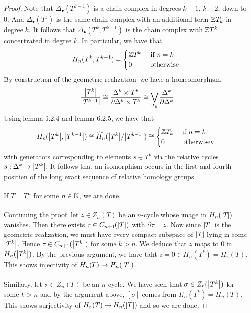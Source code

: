 \documentclass[a4paper]{article}
\begin{document}
\begin{thm}{}{}
\begin{proof}
Note that $\Delta_\bullet(T^{k-1})$ is a chain complex in degrees $k-1$, $k-2$, down to $0$. And $\Delta_\bullet(T^k)$ is the same chain complex with an additional term $\mathbb{Z} T_k$ in degree $k$. It follows that $\Delta_\bullet(T^k,T^{k-1})$ is the chain complex with $\mathbb{Z} T^k$ concentrated in degree $k$. In particular, we have that $$H_n(T^k,T^{k-1})=\begin{cases}
\mathbb{Z} T^k & \text{ if } n=k\\
0 & \text{ otherwise }
\end{cases}$$
By construction of the geometric realization, we have a homeomorphism $$\frac{\abs{T^k}}{\abs{T^{k-1}}}\cong\frac{\Delta^k\times T^k}{\partial\Delta^k\times T^k}\cong\bigvee_{T_k}\frac{\Delta^k}{\partial\Delta^k}$$ Using lemma 6.2.4 and lemma 6.2.5, we have that $$H_n(\abs{T^k},\abs{T^{k-1}})\cong\widetilde{H_n}(\abs{T^k}/\abs{T^{k-1}})\cong\begin{cases}
\mathbb{Z} T_k & \text{ if } n=k\\
0 & \text{ otherwisev }
\end{cases}$$
with generators corresponding to elements $s\in T^k$ via the relative cycles $s:\Delta^k\to\abs{T^k}$. It follows that an isomorphism occurs in the first and fourth position of the long exact sequence of relative homology groups. \\~\\

If $T=T^n$ for some $n\in\mathbb{N}$, we are done. \\~\\

Continuing the proof, let $z\in Z_n(T)$ be an $n$-cycle whose image in $H_n(\abs{T})$ vanishes. Then there exists $\tau\in C_{n+1}(\abs{T})$ with $\partial\tau=z$. Now since $\abs{T}$ is the geometric realization, we must have every compact subspace of $\abs{T}$ lying in some $\abs{T^k}$. Hence $\tau\in C_{n+1}(\abs{T^k})$ for some $k>n$. We deduce that $z$ maps to $0$ in $H_n(\abs{T^k})$. By the previous argument, we have taht $z=0\in H_n(T^k)=H_n(T)$. This shows injectivity of $H_n(T)\to H_n(\abs{T})$. \\~\\

Similarly, let $\sigma\in Z_n(T)$ be an $n$-cycle. We have seen that $\sigma\in Z_n(\abs{T^k})$ for some $k>n$ and by the argument above, $[\sigma]$ comes from $H_n(T^k)=H_n(T)$. This shows surjectivity of $H_n(T)\to H_n(\abs{T})$ and so we are done. 
\end{proof}
\end{thm}
\end{document}
